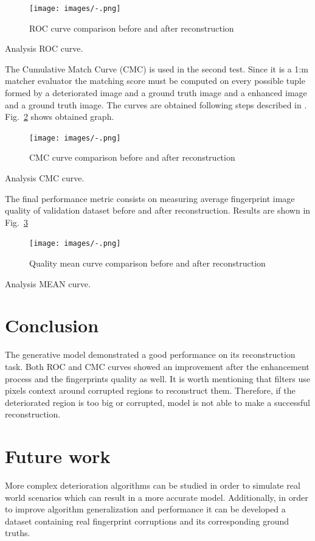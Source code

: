 \documentclass[a4paper,fleqn]{cas-dc}
\begin{document}
\begin{figure}[htbp]
\centerline{\texttt{[image: images/-.png]}}
\caption{ROC curve comparison before and after reconstruction}
\label{fig9}
\end{figure}

Analysis ROC curve.

The Cumulative Match Curve (CMC) is used in the second test. Since it is a 1:m matcher evaluator the matching score must be computed on every possible tuple formed by a deteriorated image and a ground truth image and a enhanced image and a ground truth image. The curves are obtained following steps described in \hyperref[sec:ref6]{\cite{b6}}. Fig.~\ref{fig10} shows obtained graph.

\begin{figure}[htbp]
\centerline{\texttt{[image: images/-.png]}}
\caption{CMC curve comparison before and after reconstruction}
\label{fig10}
\end{figure}

Analysis CMC curve.

The final performance metric consists on measuring average fingerprint image quality of validation dataset before and after reconstruction. Results are shown in Fig.~\ref{fig11}

\begin{figure}[htbp]
\centerline{\texttt{[image: images/-.png]}}
\caption{Quality mean curve comparison before and after reconstruction}
\label{fig11}
\end{figure}

Analysis MEAN curve.

\section{Conclusion}
\label{sec:CON}

The generative model demonstrated a good performance on its reconstruction task. Both ROC and CMC curves showed an improvement after the enhancement process and the fingerprints quality as well. It is worth mentioning that filters use pixels context around corrupted regions to reconstruct them. Therefore, if the deteriorated region is too big or corrupted, model is not able to make a successful reconstruction. 

\section{Future work}
\label{sec:FW}

More complex deterioration algorithms can be studied in order to simulate real world scenarios which can result in a more accurate model. Additionally, in order to improve algorithm generalization and performance it can be developed a dataset containing real fingerprint corruptions and its corresponding ground truths.
\end{document}
